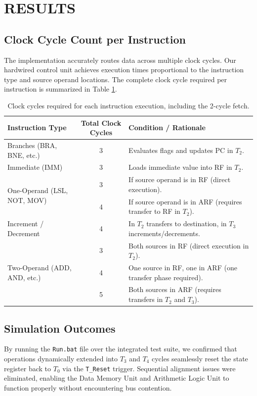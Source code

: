 \documentclass[pdftex,12pt,a4paper]{article}
\begin{document}
\section{RESULTS}

\subsection{Clock Cycle Count per Instruction}
The implementation accurately routes data across multiple clock cycles. Our hardwired control unit achieves execution times proportional to the instruction type and source operand locations. The complete clock cycle required per instruction is summarized in Table \ref{table:cycles}.

\begin{table}[H]
\centering
\caption{Clock cycles required for each instruction execution, including the 2-cycle fetch.}
\label{table:cycles}
\vspace{0.3cm}
\renewcommand{\arraystretch}{1.2}
\begin{tabular}{|l|c|l|}
\hline
\textbf{Instruction Type} & \textbf{Total Clock Cycles} & \textbf{Condition / Rationale} \\ \hline
Branches (BRA, BNE, etc.) & 3 & Evaluates flags and updates PC in $T_2$. \\ \hline
Immediate (IMM)           & 3 & Loads immediate value into RF in $T_2$. \\ \hline
\multirow{2}{*}{One-Operand (LSL, NOT, MOV)} & 3 & If source operand is in RF (direct execution). \\ \cline{2-3} 
                          & 4 & If source operand is in ARF (requires transfer to RF in $T_2$). \\ \hline
Increment / Decrement     & 4 & In $T_2$ transfers to destination, in $T_3$ increments/decrements. \\ \hline
\multirow{3}{*}{Two-Operand (ADD, AND, etc.)} & 3 & Both sources in RF (direct execution in $T_2$). \\ \cline{2-3} 
                          & 4 & One source in RF, one in ARF (one transfer phase required). \\ \cline{2-3} 
                          & 5 & Both sources in ARF (requires transfers in $T_2$ and $T_3$). \\ \hline
\end{tabular}
\end{table}

\subsection{Simulation Outcomes}
By running the \texttt{Run.bat} file over the integrated test suite, we confirmed that operations dynamically extended into $T_3$ and $T_4$ cycles seamlessly reset the state register back to $T_0$ via the \texttt{T\_Reset} trigger. Sequential alignment issues were eliminated, enabling the Data Memory Unit and Arithmetic Logic Unit to function properly without encountering bus contention.
\end{document}

